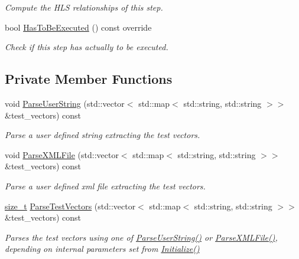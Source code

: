 \begin{DoxyCompactItemize}
\begin{DoxyCompactList}\small\item\em Compute the H\+LS relationships of this step. \end{DoxyCompactList}\item 
bool \hyperlink{classTestVectorParser_aed4c7043035bd2cb2f0e9ebf32efd66f}{Has\+To\+Be\+Executed} () const override
\begin{DoxyCompactList}\small\item\em Check if this step has actually to be executed. \end{DoxyCompactList}\end{DoxyCompactItemize}
\subsection*{Private Member Functions}
\begin{DoxyCompactItemize}
\item 
void \hyperlink{classTestVectorParser_a92e072b1028880a427b199a32b020f23}{Parse\+User\+String} (std\+::vector$<$ std\+::map$<$ std\+::string, std\+::string $>$$>$ \&test\+\_\+vectors) const
\begin{DoxyCompactList}\small\item\em Parse a user defined string extracting the test vectors. \end{DoxyCompactList}\item 
void \hyperlink{classTestVectorParser_a0509f3e5b9c496651e6d896ce8d099c0}{Parse\+X\+M\+L\+File} (std\+::vector$<$ std\+::map$<$ std\+::string, std\+::string $>$$>$ \&test\+\_\+vectors) const
\begin{DoxyCompactList}\small\item\em Parse a user defined xml file extracting the test vectors. \end{DoxyCompactList}\item 
\hyperlink{tutorial__fpt__2017_2intro_2sixth_2test_8c_a7c94ea6f8948649f8d181ae55911eeaf}{size\+\_\+t} \hyperlink{classTestVectorParser_aee7869de887840eda1288d87a1e19a7b}{Parse\+Test\+Vectors} (std\+::vector$<$ std\+::map$<$ std\+::string, std\+::string $>$$>$ \&test\+\_\+vectors) const
\begin{DoxyCompactList}\small\item\em Parses the test vectors using one of \hyperlink{classTestVectorParser_a92e072b1028880a427b199a32b020f23}{Parse\+User\+String()} or \hyperlink{classTestVectorParser_a0509f3e5b9c496651e6d896ce8d099c0}{Parse\+X\+M\+L\+File()}, depending on internal parameters set from \hyperlink{classTestVectorParser_aa48917a5ac5ec20341754ec35edd6b3a}{Initialize()} \end{DoxyCompactList}\end{DoxyCompactItemize}
